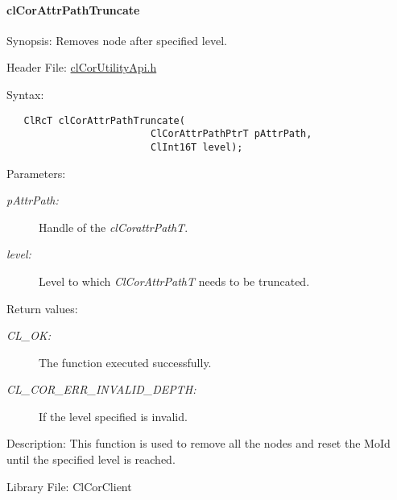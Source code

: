 \hypertarget{pagecor258}{}\paragraph{cl\-Cor\-Attr\-Path\-Truncate}\label{pagecor258}
\begin{Desc}
\item[Synopsis:]Removes node after specified level.\end{Desc}
\begin{Desc}
\item[Header File:]\hyperlink{cl_cor_utility_api_8h}{cl\-Cor\-Utility\-Api.h}\end{Desc}
\begin{Desc}
\item[Syntax:]

\footnotesize\begin{verbatim}   ClRcT clCorAttrPathTruncate(
                         ClCorAttrPathPtrT pAttrPath,
                         ClInt16T level);
\end{verbatim}
\normalsize
\end{Desc}
\begin{Desc}
\item[Parameters:]
\begin{description}
\item[{\em p\-Attr\-Path:}]Handle of the {\em cl\-Corattr\-Path\-T\/}. \item[{\em level:}]Level to which {\em Cl\-Cor\-Attr\-Path\-T\/} needs to be truncated.\end{description}
\end{Desc}
\begin{Desc}
\item[Return values:]
\begin{description}
\item[{\em CL\_\-OK:}]The function executed successfully. \item[{\em CL\_\-COR\_\-ERR\_\-INVALID\_\-DEPTH:}]If the level specified is invalid.\end{description}
\end{Desc}
\begin{Desc}
\item[Description:]This function is used to remove all the nodes and reset the Mo\-Id until the specified level is reached.\end{Desc}
\begin{Desc}
\item[Library File:]Cl\-Cor\-Client\end{Desc}
